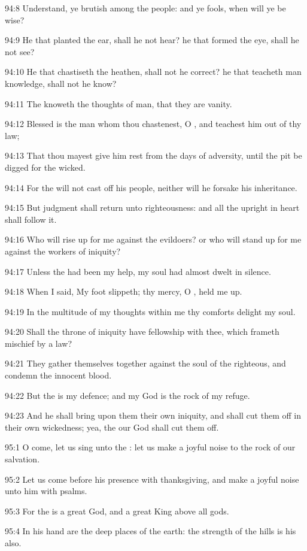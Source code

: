 94:8 Understand, ye brutish among the people: and ye fools, when will
ye be wise?

94:9 He that planted the ear, shall he not hear? he that formed the
eye, shall he not see?

94:10 He that chastiseth the heathen, shall not he correct? he that
teacheth man knowledge, shall not he know?

94:11 The \LORD knoweth the thoughts of man, that they are vanity.

94:12 Blessed is the man whom thou chastenest, O \LORD, and teachest
him out of thy law;

94:13 That thou mayest give him rest from the days of adversity, until
the pit be digged for the wicked.

94:14 For the \LORD will not cast off his people, neither will he
forsake his inheritance.

94:15 But judgment shall return unto righteousness: and all the
upright in heart shall follow it.

94:16 Who will rise up for me against the evildoers? or who will stand
up for me against the workers of iniquity?

94:17 Unless the \LORD had been my help, my soul had almost dwelt in
silence.

94:18 When I said, My foot slippeth; thy mercy, O \LORD, held me up.

94:19 In the multitude of my thoughts within me thy comforts delight
my soul.

94:20 Shall the throne of iniquity have fellowship with thee, which
frameth mischief by a law?

94:21 They gather themselves together against the soul of the
righteous, and condemn the innocent blood.

94:22 But the \LORD is my defence; and my God is the rock of my refuge.

94:23 And he shall bring upon them their own iniquity, and shall cut
them off in their own wickedness; yea, the \LORD our God shall cut them
off.



95:1 O come, let us sing unto the \LORD: let us make a joyful noise to
the rock of our salvation.

95:2 Let us come before his presence with thanksgiving, and make a
joyful noise unto him with psalms.

95:3 For the \LORD is a great God, and a great King above all gods.

95:4 In his hand are the deep places of the earth: the strength of the
hills is his also.

